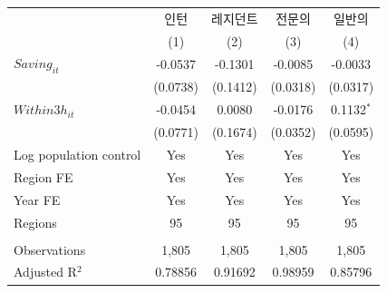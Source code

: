 \begingroup
\centering
\begin{tabular}{lcccc}
   \toprule
                          & 인턴     & 레지던트 & 전문의   & 일반의 \\   
                          & (1)      & (2)      & (3)      & (4)\\  
   \midrule 
   $Saving_{it}$          & -0.0537  & -0.1301  & -0.0085  & -0.0033\\   
                          & (0.0738) & (0.1412) & (0.0318) & (0.0317)\\   
   $Within3h_{it}$        & -0.0454  & 0.0080   & -0.0176  & 0.1132$^{*}$\\   
                          & (0.0771) & (0.1674) & (0.0352) & (0.0595)\\   
   Log population control & Yes      & Yes      & Yes      & Yes\\  
   Region FE              & Yes      & Yes      & Yes      & Yes\\  
   Year FE                & Yes      & Yes      & Yes      & Yes\\  
   Regions                & 95       & 95       & 95       & 95\\  
    \\
   Observations           & 1,805    & 1,805    & 1,805    & 1,805\\  
   Adjusted R$^2$         & 0.78856  & 0.91692  & 0.98959  & 0.85796\\  
   \bottomrule
\end{tabular}
\par\endgroup

